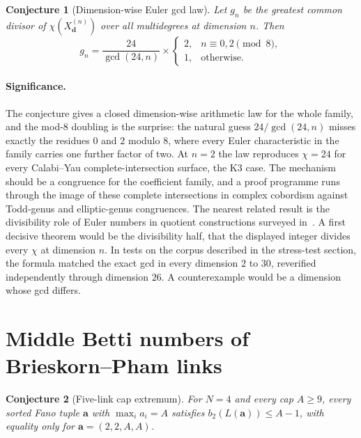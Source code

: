 \documentclass[11pt]{article}
\newtheorem{conjecture}{Conjecture}
\theoremstyle{definition}
\begin{document}
\begin{conjecture}[Dimension-wise Euler gcd law]\label{x5}
Let $g_n$ be the greatest common divisor of $\chi(X^{(n)}_{\mathbf d})$ over all multidegrees at dimension $n$.  Then
\[
g_n=\frac{24}{\gcd(24,n)}\times
\begin{cases}
2,&n\equiv0,2\pmod8,\\
1,&\text{otherwise}.
\end{cases}
\]
\end{conjecture}

\paragraph{Significance.}
The conjecture gives a closed dimension-wise arithmetic law for the whole family, and the mod-$8$ doubling is the surprise: the natural guess $24/\gcd(24,n)$ misses exactly the residues $0$ and $2$ modulo $8$, where every Euler characteristic in the family carries one further factor of two.  At $n=2$ the law reproduces $\chi=24$ for every Calabi--Yau complete-intersection surface, the K3 case.  The mechanism should be a congruence for the coefficient family, and a proof programme runs through the image of these complete intersections in complex cobordism against Todd-genus and elliptic-genus congruences.  The nearest related result is the divisibility role of Euler numbers in quotient constructions surveyed in~\cite{He21}.  A first decisive theorem would be the divisibility half, that the displayed integer divides every $\chi$ at dimension $n$.  In tests on the corpus described in the stress-test section, the formula matched the exact gcd in every dimension $2$ to $30$, reverified independently through dimension $26$.  A counterexample would be a dimension whose gcd differs.

\section{Middle Betti numbers of Brieskorn--Pham links}

\begin{conjecture}[Five-link cap extremum]\label{x6}
For $N=4$ and every cap $A\ge9$, every sorted Fano tuple $\mathbf a$ with $\max_ia_i=A$ satisfies $b_2(L(\mathbf a))\le A-1$, with equality only for $\mathbf a=(2,2,A,A)$.
\end{conjecture}
\end{document}
